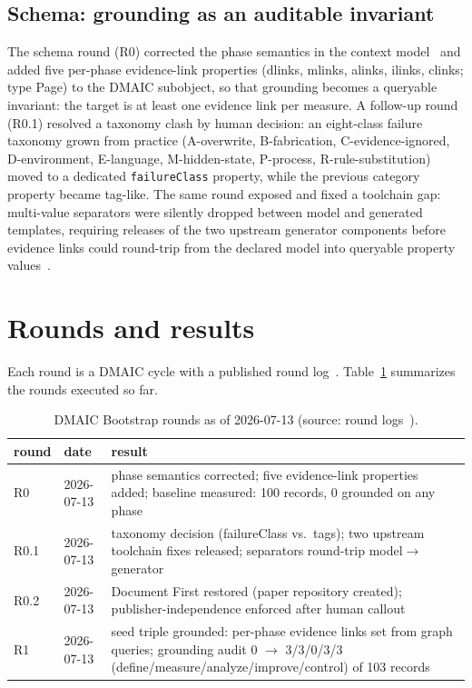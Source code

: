 \documentclass[
]{ceurart}
\begin{document}
\subsection{Schema: grounding as an auditable invariant}
The schema round (R0) corrected the phase semantics in the context
model~\cite{agentteamcontext} and added five per-phase evidence-link
properties (dlinks, mlinks, alinks, ilinks, clinks; type Page) to the
DMAIC subobject, so that grounding becomes a queryable invariant: the
target is at least one evidence link per measure. A follow-up round
(R0.1) resolved a taxonomy clash by human decision: an eight-class failure
taxonomy grown from practice (A-overwrite, B-fabrication,
C-evidence-ignored, D-environment, E-language, M-hidden-state, P-process,
R-rule-substitution) moved to a dedicated \texttt{failureClass} property,
while the previous category property became tag-like. The same round
exposed and fixed a toolchain gap: multi-value separators were silently
dropped between model and generated templates, requiring releases of the
two upstream generator components before evidence links could round-trip
from the declared model into queryable property
values~\cite{dmaicbootstrap}.

\section{Rounds and results}\label{sec:rounds}
Each round is a DMAIC cycle with a published round
log~\cite{dmaicbootstrap}. Table~\ref{tab:rounds} summarizes the rounds
executed so far.

\begin{table}
\caption{DMAIC Bootstrap rounds as of 2026-07-13 (source: round
  logs~\cite{dmaicbootstrap}).}
\label{tab:rounds}
\begin{tabular}{llp{7.5cm}}
\hline
round & date & result \\
\hline
R0   & 2026-07-13 & phase semantics corrected; five evidence-link
properties added; baseline measured: 100 records, 0 grounded on any
phase \\
R0.1 & 2026-07-13 & taxonomy decision (failureClass vs.\ tags); two
upstream toolchain fixes released; separators round-trip
model$\rightarrow$generator \\
R0.2 & 2026-07-13 & Document First restored (paper repository created);
publisher-independence enforced after human callout \\
R1   & 2026-07-13 & seed triple grounded: per-phase evidence links set
from graph queries; grounding audit 0 $\rightarrow$ 3/3/0/3/3
(define/measure/analyze/improve/control) of 103 records \\
\hline
\end{tabular}
\end{table}
\end{document}
